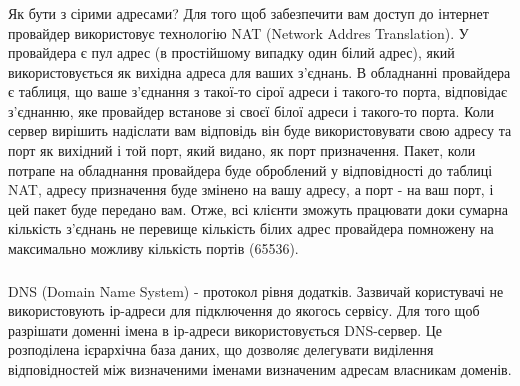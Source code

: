 \documentclass[t]{beamer}  %
\begin{document}
\begin{frame}
 	\frametitle{\insertsection} 
 	\framesubtitle{\insertsubsection}
Як бути з сірими адресами? Для того щоб забезпечити вам доступ до інтернет провайдер використовує технологію NAT (Network Addres Translation). У провайдера є пул адрес (в простійшому випадку один білий адрес), який використовується як вихідна адреса для ваших з'єднань. В обладнанні провайдера є таблиця, що ваше з'єднання з такої-то сірої адреси і такого-то порта, відповідає з'єднанню, яке провайдер встанове зі своєї білої адреси і такого-то порта. Коли сервер вирішить надіслати вам відповідь він буде використовувати свою адресу та порт як вихідний і той порт, який видано, як порт призначення. Пакет, коли потрапе на обладнання провайдера буде оброблений у відповідності до таблиці NAT, адресу призначення буде змінено на вашу адресу, а порт - на ваш порт, і цей пакет буде передано вам. Отже, всі клієнти зможуть працювати доки сумарна кількість з'єднань не перевище кількість білих адрес провайдера помножену на максимально можливу кількість портів (65536).
\end{frame}

\begin{frame}
 	\frametitle{\insertsection} 
 	\framesubtitle{\insertsubsection}
DNS (Domain Name System) - протокол рівня додатків. Зазвичай користувачі не використовують ір-адреси для підключення до якогось сервісу. Для того щоб разрішати доменні імена в ір-адреси використовується DNS-сервер. Це розподілена ієрархічна база даних, що дозволяє делегувати виділення відповідностей між визначеними іменами визначеним адресам власникам доменів.
\end{frame}
\end{document}
